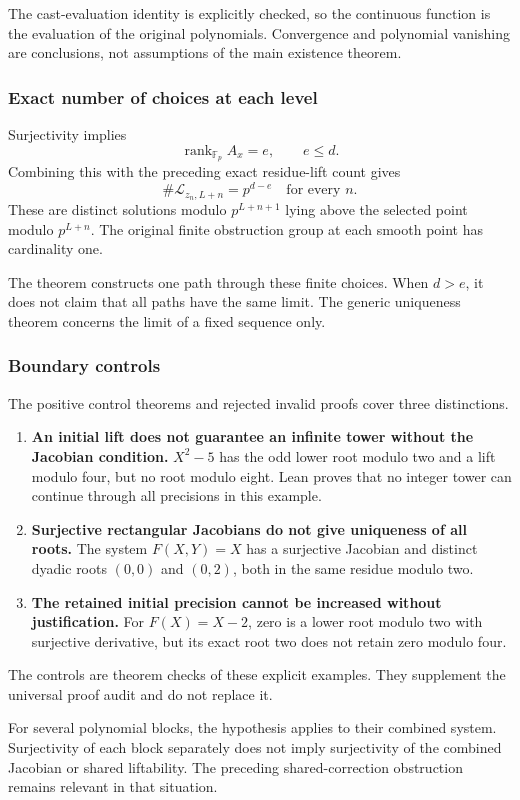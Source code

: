 The cast-evaluation identity is explicitly checked, so the continuous
function is the evaluation of the original polynomials. Convergence and
polynomial vanishing are conclusions, not assumptions of the main
existence theorem.

\hypertarget{cont3:exact-number-of-choices-at-each-level}{%
\subsubsection{Exact number of choices at each
level}\label{cont3:exact-number-of-choices-at-each-level}}

Surjectivity implies \[
\operatorname{rank}_{\mathbb F_p}A_x=e,\qquad e\le d.
\] Combining this with the preceding exact residue-lift count gives \[
\boxed{\#\mathcal L_{z_n,L+n}=p^{d-e}\quad\text{for every }n.}
\] These are distinct solutions modulo \(p^{L+n+1}\) lying above the
selected point modulo \(p^{L+n}\). The original finite obstruction group
at each smooth point has cardinality one.

The theorem constructs one path through these finite choices. When
\(d>e\), it does not claim that all paths have the same limit. The
generic uniqueness theorem concerns the limit of a fixed sequence only.

\hypertarget{cont3:boundary-controls}{%
\subsubsection{Boundary controls}\label{cont3:boundary-controls}}

The positive control theorems and rejected invalid proofs cover three
distinctions.

\begin{enumerate}
\def\labelenumi{\arabic{enumi}.}
\tightlist
\item
  \textbf{An initial lift does not guarantee an infinite tower without
  the Jacobian condition.} \(X^2-5\) has the odd lower root modulo two
  and a lift modulo four, but no root modulo eight. Lean proves that no
  integer tower can continue through all precisions in this example.
\item
  \textbf{Surjective rectangular Jacobians do not give uniqueness of all
  roots.} The system \(F(X,Y)=X\) has a surjective Jacobian and distinct
  dyadic roots \((0,0)\) and \((0,2)\), both in the same residue modulo
  two.
\item
  \textbf{The retained initial precision cannot be increased without
  justification.} For \(F(X)=X-2\), zero is a lower root modulo two with
  surjective derivative, but its exact root two does not retain zero
  modulo four.
\end{enumerate}

The controls are theorem checks of these explicit examples. They
supplement the universal proof audit and do not replace it.

For several polynomial blocks, the hypothesis applies to their combined
system. Surjectivity of each block separately does not imply
surjectivity of the combined Jacobian or shared liftability. The
preceding shared-correction obstruction remains relevant in that
situation.
